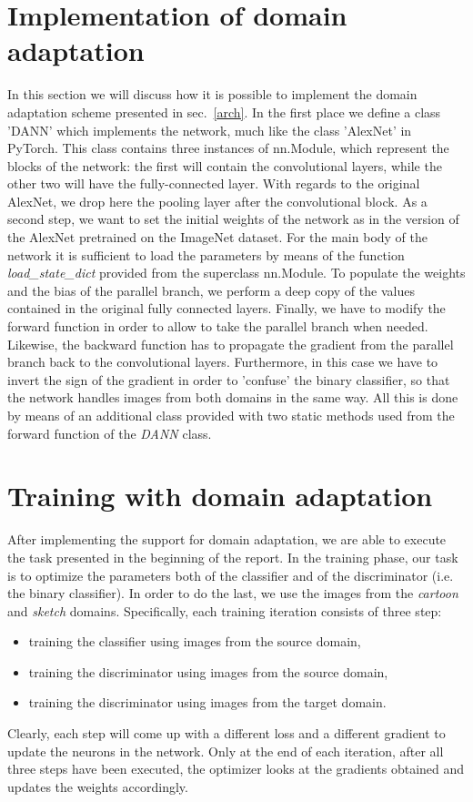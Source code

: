 \documentclass[11pt,twoside,a4paper]{article}
\begin{document}
\section{Implementation of domain adaptation}
In this section we will discuss how it is possible to implement the domain adaptation scheme presented in sec.~\ref{arch}. In the first place we define a class 'DANN' which implements the network, much like the class 'AlexNet' in PyTorch. This class contains three instances of nn.Module, which represent the blocks of the network: the first will contain the convolutional layers, while the other two will have the fully-connected layer. With regards to the original AlexNet, we drop here the pooling layer after the convolutional block.\newline
As a second step, we want to set the initial weights of the network as in the version of the AlexNet pretrained on the ImageNet dataset. For the main body of the network it is sufficient to load the parameters by means of the function \emph{load\_state\_dict} provided from the superclass nn.Module. To populate the weights and the bias of the parallel branch, we perform a deep copy of the values contained in the original fully connected layers.\newline
Finally, we have to modify the forward function in order to allow to take the parallel branch when needed. Likewise, the backward function has to propagate the gradient from the parallel branch back to the convolutional layers. Furthermore, in this case we have to invert the sign of the gradient in order to 'confuse' the binary classifier, so that the network handles images from both domains in the same way. All this is done by means of an additional class provided with two static methods used from the forward function of the \emph{DANN} class.

\section{Training with domain adaptation}
After implementing the support for domain adaptation, we are able to execute the task presented in the beginning of the report. In the training phase, our task is to optimize the parameters both of the classifier and of the discriminator (i.e. the binary classifier). In order to do the last, we use the images from the \emph{cartoon} and \emph{sketch} domains. Specifically, each training iteration consists of three step:
\begin{itemize}
\item training the classifier using images from the source domain,
\item training the discriminator using images from the source domain,
\item training the discriminator using images from the target domain.
\end{itemize}
Clearly, each step will come up with a different loss and a different gradient to update the neurons in the network. Only at the end of each iteration, after all three steps have been executed, the optimizer looks at the gradients obtained and updates the weights accordingly.
\end{document}
